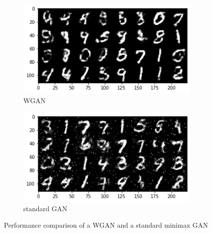 \documentclass[11pt,conference,compsoc]{IEEEtran}
\begin{document}
\begin{figure}[]
        \centering
         \begin{subfigure}{0.40\linewidth}
            \includegraphics[width=\linewidth]{images/wgan_rep.png}
            \caption{WGAN}
        \end{subfigure}  
        \begin{subfigure}{0.40\linewidth}
            \includegraphics[width=\linewidth]{images/gan_rep.png}
            \caption{standard GAN}
        \end{subfigure}
		        
        \caption{Performance comparison of a WGAN and a standard minimax GAN}
        \label{fig:18}
\end{figure}

\ifCLASSOPTIONcompsoc
\end{document}
